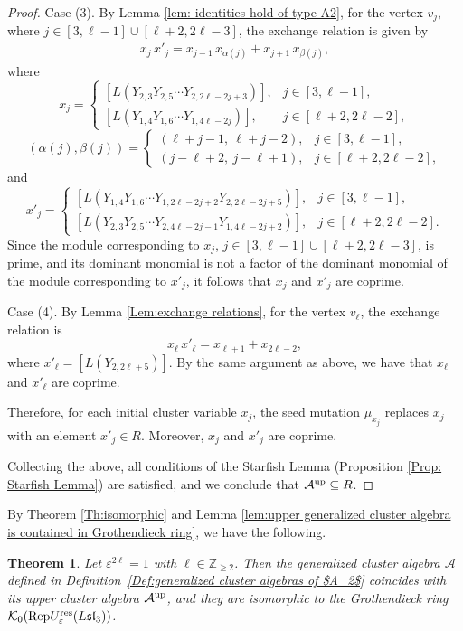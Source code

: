\documentclass[11pt, reqno]{amsart}
\theoremstyle{plain}
\newtheorem{theorem}{Theorem}[section]
\theoremstyle{definition}
\numberwithin{equation}{section}
\newcommand{\ZZ}{{\mathbb {Z}}}
\newcommand{\res}{{\rm res}}
\newcommand{\Rep}{{\rm Rep}}
\begin{document}
\begin{proof}
Case (3). By Lemma \ref{lem: identities hold of type A2}, for the vertex $v_j$, where $j\in[3,\ell-1]\cup[\ell+2,2\ell-3]$, the exchange relation is given by
\begin{align*}
x_j\,x'_j=x_{j-1}\,x_{\alpha(j)} + x_{j+1}\,x_{\beta(j)},
\end{align*}
where
\[
x_j=
\begin{cases}
[L(Y_{2,3}Y_{2,5}\cdots Y_{2, 2 \ell-2j+3})], & j\in[3,\ell-1],\\
[L(Y_{1,4}Y_{1,6}\cdots Y_{1, 4 \ell-2j})], & j\in[\ell+2,2\ell-2],
\end{cases}
\]
\[
(\alpha(j),\beta(j))=
\begin{cases}
(\ell+j-1,\ \ell+j-2), & j\in[3,\ell-1],\\
(j-\ell+2,\ j-\ell+1), & j\in[\ell+2,2\ell-2],
\end{cases}
\]
and
\[
x'_j=
\begin{cases}
[L(Y_{1,4}Y_{1,6}\cdots Y_{1, 2 \ell-2j+2}Y_{2, 2 \ell-2j+5})], & j\in[3,\ell-1],\\
[L(Y_{2,3}Y_{2,5}\cdots Y_{2, 4 \ell-2j-1}Y_{1, 4 \ell-2j+2})], & j\in[\ell+2,2\ell-2].
\end{cases}
\]
Since the module corresponding to $x_j$, $j\in[3,\ell-1]\cup[\ell+2,2\ell-3]$, is prime, and its dominant monomial is not a factor of the dominant monomial of the module corresponding to $x'_j$, it follows that $x_j$ and $x'_j$ are coprime.

Case (4). By Lemma \ref{Lem:exchange relations}, for the vertex $v_\ell$, the exchange relation is
\[
x_\ell\,x'_\ell=x_{\ell+1}+x_{2\ell-2},
\]
where $x'_\ell=[L(Y_{2,2\ell+5})]$. By the same argument as above, we have that $x_\ell$ and $x'_\ell$ are coprime.

Therefore, for each initial cluster variable $x_j$, the seed mutation $\mu_{x_j}$ replaces $x_j$ with an element $x'_j \in R$. Moreover, $x_j$ and $x'_j$ are coprime. 

Collecting the above, all conditions of the Starfish Lemma (Proposition \ref{Prop: Starfish Lemma}) are satisfied, and we conclude that $\mathcal A^{\rm up}\subseteq R$.
\end{proof}


By Theorem \ref{Th:isomorphic} and Lemma \ref{lem:upper generalized cluster algebra is contained in Grothendieck ring}, we have the following.

\begin{theorem}
Let $\varepsilon^{2 \ell}=1$ with $\ell\in\ZZ_{\geq 2}$. Then the generalized cluster algebra $\mathcal{A}$ defined in Definition~\ref{Def:generalized cluster algebras of $A_2$} coincides with its upper cluster algebra $\mathcal{A}^{\rm up}$, and they are isomorphic to the Grothendieck ring $\mathcal{K}_0(\Rep U_{\varepsilon}^{\res}(L\mathfrak{sl}_3))$.
\end{theorem}
\end{document}
